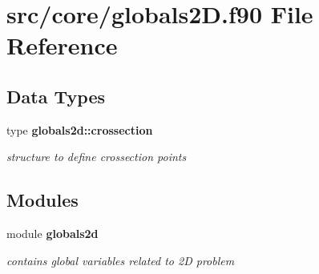 \section{src/core/globals2D.f90 File Reference}
\label{globals2_d_8f90}
\subsection*{Data Types}
\begin{DoxyCompactItemize}
\item 
type {\bf globals2d\+::crossection}
\begin{DoxyCompactList}\small\item\em structure to define crossection points \end{DoxyCompactList}\end{DoxyCompactItemize}
\subsection*{Modules}
\begin{DoxyCompactItemize}
\item 
module {\bf globals2d}
\begin{DoxyCompactList}\small\item\em contains global variables related to 2D problem \end{DoxyCompactList}\end{DoxyCompactItemize}
